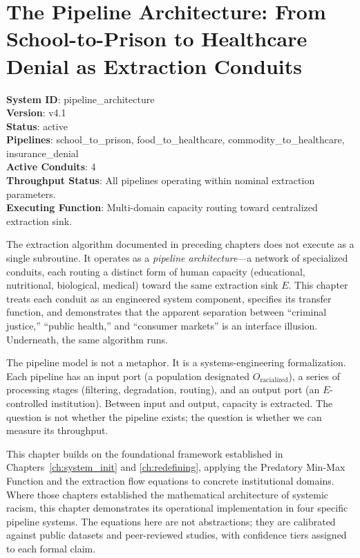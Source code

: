 \chapter{The Pipeline Architecture: From School-to-Prison to Healthcare Denial as Extraction Conduits}
\label{ch:pipeline_architecture}

\providecommand{\SourceNote}[1]{\footnote{#1}}

\begin{tcolorbox}[colback=black!5, colframe=black!70, fonttitle=\bfseries\ttfamily, title=RUNTIME LOG: PIPELINE ARCHITECTURE v4.1]
\ttfamily\small
\textbf{System ID}: pipeline\_architecture\\
\textbf{Version}: v4.1\\
\textbf{Status}: active\\
\textbf{Pipelines}: school\_to\_prison, food\_to\_healthcare, commodity\_to\_healthcare, insurance\_denial\\
\textbf{Active Conduits}: 4\\
\textbf{Throughput Status}: All pipelines operating within nominal extraction parameters.\\
\textbf{Executing Function}: Multi-domain capacity routing toward centralized extraction sink.
\end{tcolorbox}

\medskip

The extraction algorithm documented in preceding chapters does not execute as a single subroutine. It operates as a \textit{pipeline architecture}---a network of specialized conduits, each routing a distinct form of human capacity (educational, nutritional, biological, medical) toward the same extraction sink $E$. This chapter treats each conduit as an engineered system component, specifies its transfer function, and demonstrates that the apparent separation between ``criminal justice,'' ``public health,'' and ``consumer markets'' is an interface illusion. Underneath, the same algorithm runs.

The pipeline model is not a metaphor. It is a systems-engineering formalization. Each pipeline has an input port (a population designated $O_{\text{racialized}}$), a series of processing stages (filtering, degradation, routing), and an output port (an $E$-controlled institution). Between input and output, capacity is extracted. The question is not whether the pipeline exists; the question is whether we can measure its throughput.

This chapter builds on the foundational framework established in Chapters~\ref{ch:system_init} and \ref{ch:redefining}, applying the Predatory Min-Max Function and the extraction flow equations to concrete institutional domains. Where those chapters established the mathematical architecture of systemic racism, this chapter demonstrates its operational implementation in four specific pipeline systems. The equations here are not abstractions; they are calibrated against public datasets and peer-reviewed studies, with confidence tiers assigned to each formal claim.

